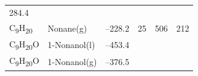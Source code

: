 \documentclass[
]{book}
\theoremstyle{definition}
\theoremstyle{definition}
\theoremstyle{definition}
\theoremstyle{remark}
\begin{document}
\begin{longtable}[]{@{}llllll@{}}
\begin{minipage}[t]{0.14\columnwidth}
284.4\strut
\end{minipage}\tabularnewline
\begin{minipage}[t]{0.07\columnwidth}\raggedright
C\textsubscript{9}H\textsubscript{20}\strut
\end{minipage} & \begin{minipage}[t]{0.17\columnwidth}\raggedright
Nonane(g)\strut
\end{minipage} & \begin{minipage}[t]{0.15\columnwidth}\raggedright
--228.2\strut
\end{minipage} & \begin{minipage}[t]{0.15\columnwidth}\raggedright
25\strut
\end{minipage} & \begin{minipage}[t]{0.14\columnwidth}\raggedright
506\strut
\end{minipage} & \begin{minipage}[t]{0.14\columnwidth}\raggedright
212\strut
\end{minipage}\tabularnewline
\begin{minipage}[t]{0.07\columnwidth}\raggedright
C\textsubscript{9}H\textsubscript{20}O\strut
\end{minipage} & \begin{minipage}[t]{0.17\columnwidth}\raggedright
1-Nonanol(l)\strut
\end{minipage} & \begin{minipage}[t]{0.15\columnwidth}\raggedright
--453.4\strut
\end{minipage} & \begin{minipage}[t]{0.15\columnwidth}\raggedright
\strut
\end{minipage} & \begin{minipage}[t]{0.14\columnwidth}\raggedright
\strut
\end{minipage} & \begin{minipage}[t]{0.14\columnwidth}\raggedright
\strut
\end{minipage}\tabularnewline
\begin{minipage}[t]{0.07\columnwidth}\raggedright
C\textsubscript{9}H\textsubscript{20}O\strut
\end{minipage} & \begin{minipage}[t]{0.17\columnwidth}\raggedright
1-Nonanol(g)\strut
\end{minipage} & \begin{minipage}[t]{0.15\columnwidth}\raggedright
--376.5\strut
\end{minipage} & \begin{minipage}[t]{0.15\columnwidth}\raggedright

\end{minipage}
\end{longtable}
\end{document}
